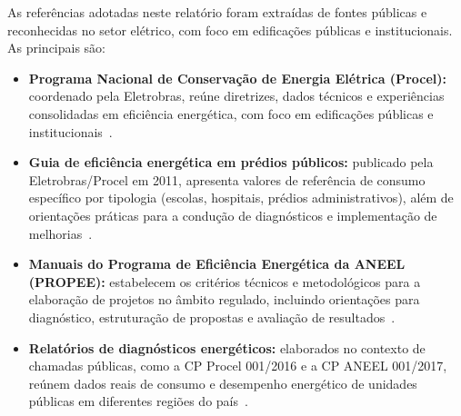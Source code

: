 \documentclass{DIAG_PMS}
\begin{document}
\renewcommand{\bibsection}{}




\newpage

As referências adotadas neste relatório foram extraídas de fontes públicas e reconhecidas no setor elétrico, com foco em edificações públicas e institucionais. As principais são:

\begin{itemize}
    \item \textbf{Programa Nacional de Conservação de Energia Elétrica (Procel):} coordenado pela Eletrobras, reúne diretrizes, dados técnicos e experiências consolidadas em eficiência energética, com foco em edificações públicas e institucionais~\cite{procel_geral}.

    \item \textbf{Guia de eficiência energética em prédios públicos:} publicado pela Eletrobras/Procel em 2011, apresenta valores de referência de consumo específico por tipologia (escolas, hospitais, prédios administrativos), além de orientações práticas para a condução de diagnósticos e implementação de melhorias~\cite{procel_guia2011}.

    \item \textbf{Manuais do Programa de Eficiência Energética da ANEEL (PROPEE):} estabelecem os critérios técnicos e metodológicos para a elaboração de projetos no âmbito regulado, incluindo orientações para diagnóstico, estruturação de propostas e avaliação de resultados~\cite{propee_aneel}.

    \item \textbf{Relatórios de diagnósticos energéticos:} elaborados no contexto de chamadas públicas, como a CP Procel 001/2016 e a CP ANEEL 001/2017, reúnem dados reais de consumo e desempenho energético de unidades públicas em diferentes regiões do país~\cite{diagnosticos_chamadas}.
\end{itemize}
\vspace{1em}
\end{document}
